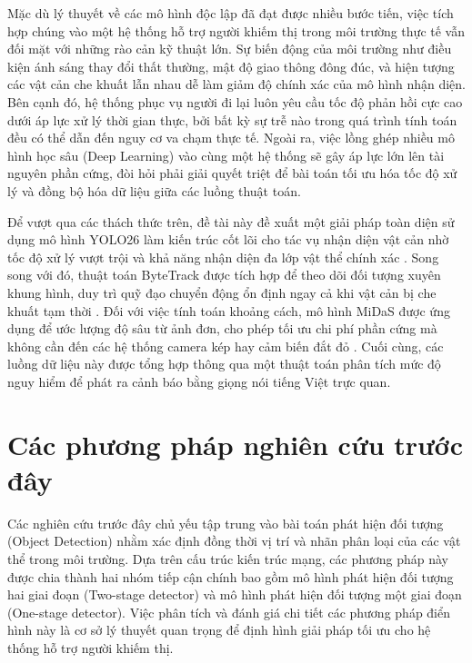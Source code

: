 Mặc dù lý thuyết về các mô hình độc lập đã đạt được nhiều bước tiến, việc tích hợp chúng vào một hệ thống hỗ trợ người khiếm thị trong môi trường thực tế vẫn đối mặt với những rào cản kỹ thuật lớn. Sự biến động của môi trường như điều kiện ánh sáng thay đổi thất thường, mật độ giao thông đông đúc, và hiện tượng các vật cản che khuất lẫn nhau dễ làm giảm độ chính xác của mô hình nhận diện. Bên cạnh đó, hệ thống phục vụ người đi lại luôn yêu cầu tốc độ phản hồi cực cao dưới áp lực xử lý thời gian thực, bởi bất kỳ sự trễ nào trong quá trình tính toán đều có thể dẫn đến nguy cơ va chạm thực tế. Ngoài ra, việc lồng ghép nhiều mô hình học sâu (Deep Learning) vào cùng một hệ thống sẽ gây áp lực lớn lên tài nguyên phần cứng, đòi hỏi phải giải quyết triệt để bài toán tối ưu hóa tốc độ xử lý và đồng bộ hóa dữ liệu giữa các luồng thuật toán.

Để vượt qua các thách thức trên, đề tài này đề xuất một giải pháp toàn diện sử dụng mô hình YOLO26 làm kiến trúc cốt lõi cho tác vụ nhận diện vật cản nhờ tốc độ xử lý vượt trội và khả năng nhận diện đa lớp vật thể chính xác \cite{Reference3}. Song song với đó, thuật toán ByteTrack được tích hợp để theo dõi đối tượng xuyên khung hình, duy trì quỹ đạo chuyển động ổn định ngay cả khi vật cản bị che khuất tạm thời \cite{Reference4}. Đối với việc tính toán khoảng cách, mô hình MiDaS được ứng dụng để ước lượng độ sâu từ ảnh đơn, cho phép tối ưu chi phí phần cứng mà không cần đến các hệ thống camera kép hay cảm biến đắt đỏ \cite{Reference5}. Cuối cùng, các luồng dữ liệu này được tổng hợp thông qua một thuật toán phân tích mức độ nguy hiểm để phát ra cảnh báo bằng giọng nói tiếng Việt trực quan.

\section{Các phương pháp nghiên cứu trước đây}

Các nghiên cứu trước đây chủ yếu tập trung vào bài toán phát hiện đối tượng (Object Detection) nhằm xác định đồng thời vị trí và nhãn phân loại của các vật thể trong môi trường. Dựa trên cấu trúc kiến trúc mạng, các phương pháp này được chia thành hai nhóm tiếp cận chính bao gồm mô hình phát hiện đối tượng hai giai đoạn (Two-stage detector) và mô hình phát hiện đối tượng một giai đoạn (One-stage detector). Việc phân tích và đánh giá chi tiết các phương pháp điển hình này là cơ sở lý thuyết quan trọng để định hình giải pháp tối ưu cho hệ thống hỗ trợ người khiếm thị.

